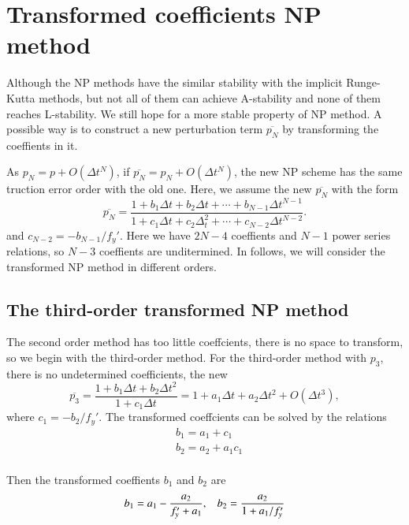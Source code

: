 \documentclass[review]{elsarticle}
\theoremstyle{plain}\newtheorem{definition}{\sc{Definition}}
\theoremstyle{defination}\newtheorem{example}{Example}[section]
\numberwithin{equation}{section}
\numberwithin{table}{section}
\begin{document}
{\section{Transformed coefficients NP method}  
Although the NP methods have  the similar stability with the implicit Runge-Kutta methods, but  not all of them can  achieve  A-stability and none of them reaches L-stability. We still hope for a more stable property of NP method.     
A possible way is  to construct a new perturbation term $\overline{p_N}$ by transforming  the coeffients in it.

As $p_N = p + O(\Delta t^{N})$, if $\overline{p_N}= p_N + O(\Delta t^{N})$, the new NP scheme has the same truction error order with the old one. Here, we  assume the new $\overline{p_N}$ with the form
\begin{equation}
  \overline{p_N} = \frac{ 1+ b_1 \Delta t+  b_2\Delta t +\cdots +b_{N-1}\Delta t^{N-1}}{1+c_1\Delta t +c_2\Delta_t^2 +\cdots+ c_{N-2}\Delta t^{N-2}}.
  \end{equation}
and 
  $c_{N-2}=-b_{N-1}/f_y'$.
  Here we have $2N-4$ coeffients and $N-1$ power series relations, so $N-3$ coeffients are  unditermined. In follows, we will consider the transformed  NP method in different orders.    

  \subsection{ The third-order transformed NP method}
The second order method has too little coeffcients, there is no space to  transform, so we begin with the third-order method. For the third-order method with $p_3$, there is no undetermined coefficients,  the new 
\begin{equation}
\overline{p_3} =
\frac{ 1+ b_1 \Delta t+ b_2\Delta t^2}{1+c_1 \Delta t} = 1+a_1\Delta t +a_2 \Delta t^2 + O(\Delta t^3),
\end{equation}
where $c_1=-b_2 /f_y'$. The transformed coeffcients can be solved by the relations
\begin{equation}
  \begin{aligned}
	&b_1=a_1+c_1\\
	&b_2=a_2+a_1c_1\\
	\end{aligned}
\end{equation}

Then the transformed coeffients $b_1$ and $b_2$ are  
\begin{equation}
  b_1= a_1- \frac{a_2}{f_y'+a_1},\hspace{0.3cm}  b_2=\frac{a_2}{1+a_1/f_y'}
\end{equation}

}
\end{document}
